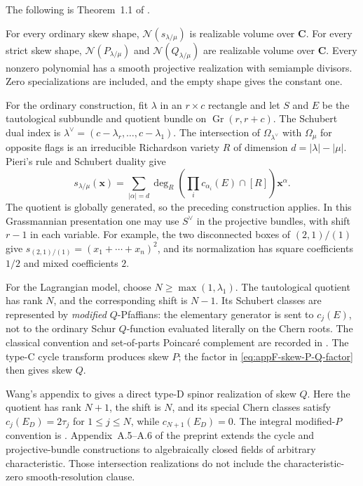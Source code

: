 The following is Theorem~1.1 of \cite{NguyenDang26RichardsonV2}.
\begin{theorem}
\label{thm:appF-skew-Schur-volume}
For every ordinary skew shape, $\mathcal N(s_{\lambda/\mu})$
is realizable volume over $\mathbf C$. For every strict skew
shape, $\mathcal N(P_{\lambda/\mu})$ and
$\mathcal N(Q_{\lambda/\mu})$ are realizable volume over
$\mathbf C$. Every nonzero polynomial has a smooth projective
realization with semiample divisors. Zero specializations are
included, and the empty shape gives the constant one.
\end{theorem}

For the ordinary construction, fit $\lambda$ in an $r\times c$
rectangle and let $S$ and $E$ be the tautological subbundle and
quotient bundle on $\operatorname{Gr}(r,r+c)$. The Schubert
dual index is
$\lambda^\vee=(c-\lambda_r,\ldots,c-\lambda_1)$.
The intersection of $\Omega_{\lambda^\vee}$ with
$\Omega_\mu$ for opposite flags is an irreducible Richardson
variety $R$ of dimension $d=|\lambda|-|\mu|$. Pieri's rule
and Schubert duality give
\[
 s_{\lambda/\mu}(\mathbf x)
   =\sum_{|\alpha|=d}
      \deg_R\left(\prod_i c_{\alpha_i}(E)\cap[R]\right)
                                                  \mathbf x^\alpha.
\tag{F.29}\label{eq:appF-Richardson-Chern}
\]
The quotient is globally generated, so the preceding construction
applies. In this Grassmannian presentation one may use $S^\vee$
in the projective bundles, with shift $r-1$ in each variable.
For example, the two disconnected boxes of $(2,1)/(1)$ give
$s_{(2,1)/(1)}=(x_1+\cdots+x_n)^2$, and its normalization
has square coefficients $1/2$ and mixed coefficients $2$.

For the Lagrangian model, choose $N\geq\max(1,\lambda_1)$.
The tautological quotient has rank $N$, and the corresponding
shift is $N-1$. Its Schubert classes are represented by
\emph{modified} $Q$-Pfaffians: the elementary generator is sent
to $c_j(E)$, not to the ordinary Schur $Q$-function evaluated
literally on the Chern roots. The classical convention and
set-of-parts Poincar\'e complement are recorded in
\cite[\S1 and \S3.1]{KreschTamvakis03LagrangianAuthor}.
The type-C cycle transform produces skew $P$; the factor in
\eqref{eq:appF-skew-P-Q-factor} then gives skew $Q$.

Wang's appendix to \cite{NguyenDang26RichardsonV2} gives a
direct type-D spinor realization of skew $Q$. Here the quotient
has rank $N+1$, the shift is $N$, and its special Chern classes
satisfy $c_j(E_D)=2\tau_j$ for $1\leq j\leq N$, while
$c_{N+1}(E_D)=0$. The integral modified-$P$ convention is
\cite[\S1 and \S3]{KreschTamvakis04OrthogonalPublished}.
Appendix~A.5--A.6 of the preprint extends the cycle and
projective-bundle constructions to algebraically closed fields
of arbitrary characteristic. Those intersection realizations
do not include the characteristic-zero smooth-resolution clause.

